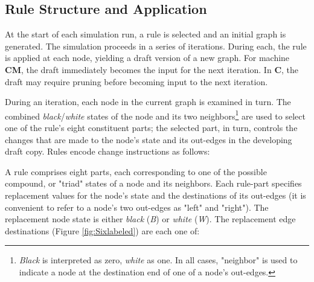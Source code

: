 \documentclass{tufte-handout}
\begin{document}
\subsection{Rule Structure and Application}

At the start of each simulation run, a rule is selected and an initial graph
is generated.  The simulation proceeds in a series of
iterations. During each, the rule is applied at each node, yielding a draft
version of a new graph. For machine \textbf{CM}, the draft immediately becomes
the input for the next iteration. In \textbf{C}, the draft may require pruning
before becoming input to the next iteration. 

During an iteration, each node in the current graph is examined in turn.
The combined \textit{black}/\textit{white} states of the node and its two neighbors\footnote{
\textit{Black} is interpreted as zero, \textit{white} as one. In
all cases, "neighbor" is used to indicate a node at the destination end of one of a node's out-edges.}
are used to select one of the rule's eight constituent parts; the selected part, in turn,
controls the changes that are made to the node's state and its out-edges in
the developing draft copy. Rules encode change instructions as follows:

A rule comprises eight parts, each corresponding to one of the possible compound, or "triad" states
of a node and its neighbors. Each rule-part specifies replacement values for
the node's state and the destinations of its out-edges
(it is convenient to refer to a node's two out-edges as "left" and "right").
The replacement node state is either \textit{black} (\textit{B}) or \textit{white} (\textit{W}).
The replacement edge destinations (Figure \ref{fig:Sixlabeled}) are each one of:
\end{document}

